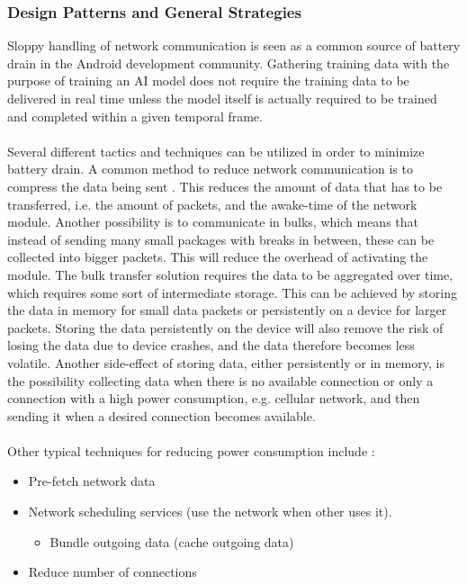 \subsubsection{Design Patterns and General Strategies}

Sloppy handling of network communication is seen as a common source of battery drain \parencite{android_network_scheduling} in the Android development community. Gathering training data with the purpose of training an AI model does not require the training data to be delivered in real time unless the model itself is actually required to be trained and completed within a given temporal frame. 
\\\\
Several different tactics and techniques can be utilized in order to minimize battery drain. A common method to reduce network communication is to compress the data being sent \parencite{har_wearables}\parencite{android_network_scheduling}. This reduces the amount of data that has to be transferred, i.e. the amount of packets, and the awake-time of the network module. Another possibility is to communicate in bulks, which means that instead of sending many small packages with breaks in between, these can be collected into bigger packets. This will reduce the overhead of activating the module. The bulk transfer solution requires the data to be aggregated over time, which requires some sort of intermediate storage. This can be achieved by storing the data in memory for small data packets or persistently on a device for larger packets. Storing the data persistently on the device will also remove the risk of losing the data due to device crashes, and the data therefore becomes less volatile. Another side-effect of storing data, either persistently or in memory, is the possibility collecting data when there is no available connection or only a connection with a high power consumption, e.g. cellular network, and then sending it when a desired connection becomes available. 
\\\\
Other typical techniques for reducing power consumption include \parencite{android_network_scheduling}:

\begin{itemize}
    \item Pre-fetch network data
    \item Network scheduling services (use the network when other uses it).
    \begin{itemize}
        \item Bundle outgoing data (cache outgoing data)
    \end{itemize}
    \item Reduce number of connections
\end{itemize}


